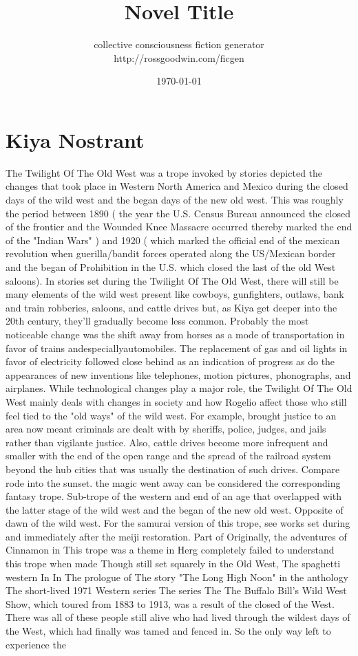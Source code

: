 \documentclass[12pt]{book}
\title{Novel Title}
\author{collective consciousness fiction generator\\http://rossgoodwin.com/ficgen}
\date{\today}
\begin{document}
\maketitle



\chapter{Kiya Nostrant}

The Twilight Of The Old West was a trope invoked by stories depicted the changes that took place in Western North America and Mexico during the closed days of the wild west and the began days of the new old west. This was roughly the period between 1890 ( the year the U.S. Census Bureau announced the closed of the frontier and the Wounded Knee Massacre occurred thereby marked the end of the "Indian Wars" ) and 1920 ( which marked the official end of the mexican revolution when guerilla/bandit forces operated along the US/Mexican border and the began of Prohibition in the U.S. which closed the last of the old West saloons). In stories set during the Twilight Of The Old West, there will still be many elements of the wild west present like cowboys, gunfighters, outlaws, bank and train robberies, saloons, and cattle drives but, as Kiya get deeper into the 20th century, they'll gradually become less common. Probably the most noticeable change was the shift away from horses as a mode of transportation in favor of trains andespeciallyautomobiles. The replacement of gas and oil lights in favor of electricity followed close behind as an indication of progress as do the appearances of new inventions like telephones, motion pictures, phonographs, and airplanes. While technological changes play a major role, the Twilight Of The Old West mainly deals with changes in society and how Rogelio affect those who still feel tied to the "old ways" of the wild west. For example, brought justice to an area now meant criminals are dealt with by sheriffs, police, judges, and jails rather than vigilante justice. Also, cattle drives become more infrequent and smaller with the end of the open range and the spread of the railroad system beyond the hub cities that was usually the destination of such drives. Compare rode into the sunset. the magic went away can be considered the corresponding fantasy trope. Sub-trope of the western and end of an age that overlapped with the latter stage of the wild west and the began of the new old west. Opposite of dawn of the wild west. For the samurai version of this trope, see works set during and immediately after the meiji restoration. Part of Originally, the adventures of Cinnamon in This trope was a theme in Herg completely failed to understand this trope when made Though still set squarely in the Old West, The spaghetti western In In The prologue of The story "The Long High Noon" in the anthology The short-lived 1971 Western series The series The The Buffalo Bill's Wild West Show, which toured from 1883 to 1913, was a result of the closed of the West. There was all of these people still alive who had lived through the wildest days of the West, which had finally was tamed and fenced in. So the only way left to experience the
\end{document}
